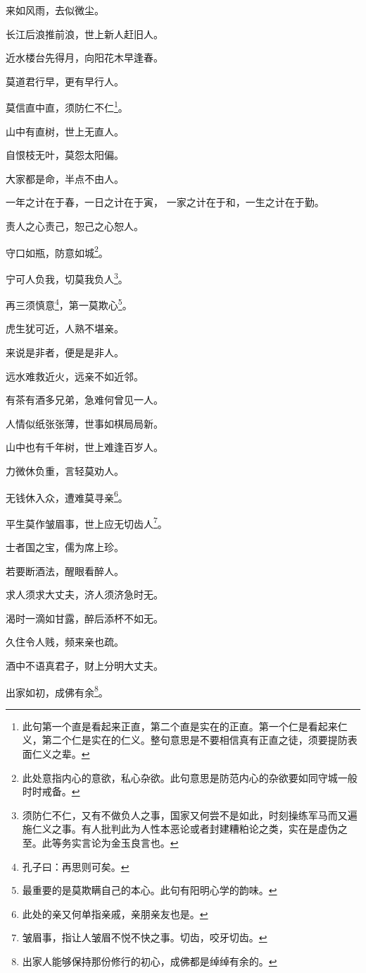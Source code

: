 \documentclass[12pt,oneside]{book}
\begin{document}
来如风雨，去似微尘。

长江后浪推前浪，世上新人赶旧人。

近水楼台先得月，向阳花木早逢春。

莫道君行早，更有早行人。

莫信直中直，须防仁不仁\footnote{此句第一个直是看起来正直，第二个直是实在的正直。第一个仁是看起来仁义，第二个仁是实在的仁义。整句意思是不要相信真有正直之徒，须要提防表面仁义之辈。}。

山中有直树，世上无直人。

自恨枝无叶，莫怨太阳偏。

大家都是命，半点不由人。

一年之计在于春，一日之计在于寅， 一家之计在于和，一生之计在于勤。

责人之心责己，恕己之心恕人。

守口如瓶，防意如城\footnote{此处意指内心的意欲，私心杂欲。此句意思是防范内心的杂欲要如同守城一般时时戒备。}。

宁可人负我，切莫我负人\footnote{须防仁不仁，又有不做负人之事，国家又何尝不是如此，时刻操练军马而又遍施仁义之事。有人批判此为人性本恶论或者封建糟粕论之类，实在是虚伪之至。此等务实言论为金玉良言也。}。

再三须慎意\footnote{孔子曰：再思则可矣。}，第一莫欺心\footnote{最重要的是莫欺瞒自己的本心。此句有阳明心学的韵味。}。

虎生犹可近，人熟不堪亲。

来说是非者，便是是非人。

远水难救近火，远亲不如近邻。

有茶有酒多兄弟，急难何曾见一人。

人情似纸张张薄，世事如棋局局新。

山中也有千年树，世上难逢百岁人。

力微休负重，言轻莫劝人。

无钱休入众，遭难莫寻亲\footnote{此处的亲又何单指亲戚，亲朋亲友也是。}。

平生莫作皱眉事，世上应无切齿人\footnote{皱眉事，指让人皱眉不悦不快之事。切齿，咬牙切齿。}。

士者国之宝，儒为席上珍。

若要断酒法，醒眼看醉人。

求人须求大丈夫，济人须济急时无。

渴时一滴如甘露，醉后添杯不如无。

久住令人贱，频来亲也疏。

酒中不语真君子，财上分明大丈夫。

出家如初，成佛有余\footnote{出家人能够保持那份修行的初心，成佛都是绰绰有余的。}。
\end{document}
